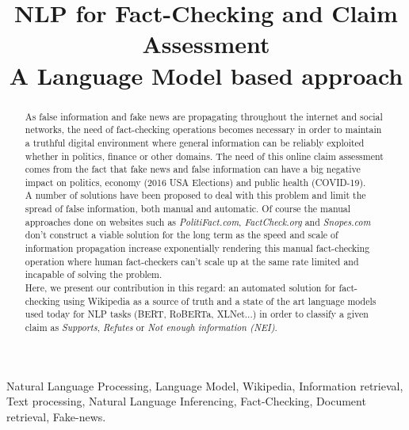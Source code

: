 \documentclass[conference]{IEEEtran}
\begin{document}
\title{NLP for Fact-Checking and Claim Assessment\\
{\Large A Language Model based approach}
}

\author{
\and
{}
}

\maketitle

\begin{abstract}
As false information and fake news are propagating throughout the internet and social networks, the need of fact-checking operations becomes necessary in order to maintain a truthful digital environment where general information can be reliably exploited whether in politics, finance or other domains. The need of this online claim assessment comes from the fact that fake news and false information can have a big negative impact on politics, economy (2016 USA Elections) and public health (COVID-19).\\ 
A number of solutions have been proposed to deal with this problem and limit the spread of false information, both manual and automatic. Of course the manual approaches done on websites such as \textit{PolitiFact.com}, \textit{FactCheck.org} and \textit{Snopes.com} don't construct a viable solution for the long term as the speed and scale of information propagation increase exponentially rendering this manual fact-checking operation where human fact-checkers can't scale up at the same rate limited and incapable of solving the problem.\\
Here, we present our contribution in this regard: an automated solution for fact-checking using Wikipedia as a source of truth and a state of the art language models used today for NLP tasks (BERT, RoBERTa, XLNet...) in order to classify a given claim as \textit{Supports}, \textit{Refutes} or \textit{Not enough information (NEI)}.\\
\end{abstract}

\begin{IEEEkeywords}
Natural Language Processing, Language Model, Wikipedia, Information retrieval, Text processing, Natural Language Inferencing, Fact-Checking, Document retrieval, Fake-news.
\end{IEEEkeywords}
\end{document}
